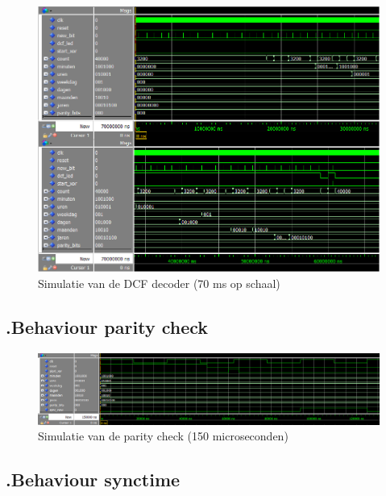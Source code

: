 \begin{figure}[ht!]
\includegraphics[width=\textwidth,height=\textheight,keepaspectratio]{Figuren/DCF77/Decoder.png}
\caption{Simulatie van de DCF decoder (70 ms op schaal)}
\end{figure}
\subsection*{\label{fig: parity_beh}\thesubsection.\quad Behaviour parity check}
\begin{figure}[ht!]
\includegraphics[width=\textwidth,height=\textheight,keepaspectratio]{Figuren/DCF77/Parity_check.png}
\caption{Simulatie van de parity check (150 microseconden)}
\end{figure}
\subsection*{\label{fig: synctime_beh}\thesubsection.\quad Behaviour synctime}
